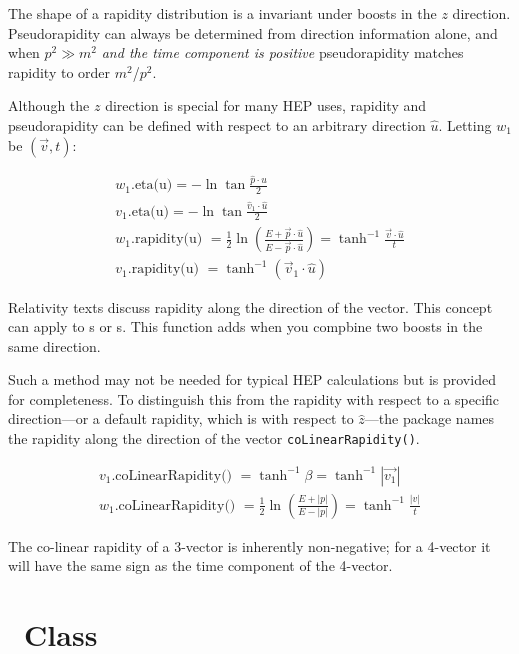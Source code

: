 \noindent
The shape of a rapidity distribution is a invariant under boosts in the $z$
direction.
Pseudorapidity can always be determined from direction information alone,
and when $ p^2 \gg m^2 $ {\em and the time component is positive}
pseudorapidity matches rapidity to order $m^2$/$p^2$.

\vspace{.2 in}

Although the $z$ direction is special for many HEP uses,
rapidity and pseudorapidity can be defined with respect to an arbitrary
direction $\hat{u}$.  Letting $w_1$ be $(\vec{v}, t)$:

\begin{eqnarray}
\label{eq:weta:4}
  w_1 \mbox{.eta(u)} = - \ln \tan \frac{\hat{p} \cdot {u}}{2} \\
\label{eq:eta:4}
  v_1 \mbox{.eta(u)} = - \ln \tan \frac{\hat{v}_1 \cdot \hat{u}} {2} \\
\label{eq:wrapid:4}
  w_1 \mbox{.rapidity(u) }
	= \frac{1}{2} \ln \left( \frac{E + \vec{p} \cdot \hat{u}}
				      {E - \vec{p} \cdot \hat{u}} \right)
	= \tanh^{-1} \frac {\vec{v} \cdot \hat{u}} {t} \\
  v_1 \mbox{.rapidity(u) } = \tanh^{-1} (\vec{v}_{1} \cdot \hat{u})
\end{eqnarray}

\noindent
Relativity texts discuss rapidity along the direction of the vector.
This concept can apply to \SV s or \LV s.
This function adds when you compbine two boosts in the same direction.

Such a method may not be needed for typical HEP calculations but
is provided for completeness.
To distinguish this from the rapidity with respect to a specific
direction---or a default rapidity, which is with respect to $\hat{z}$---the
package names the rapidity along the direction of the vector
{\tt coLinearRapidity()}.

\begin{eqnarray}
  v_1 \mbox{.coLinearRapidity() } = \tanh^{-1} \beta
	=  \tanh^{-1} \left|\vec{v_1}\right| \\
\label{eq:wcoLinRap:2}
  w_1 \mbox{.coLinearRapidity() }
	= \frac{1}{2} \ln \left( \frac{E + |p|}{E - |p|}    \right)
	= \tanh^{-1} \frac {|v|}{t}
\end{eqnarray}

\noindent
The co-linear rapidity of a 3-vector is inherently non-negative; for a
4-vector it will have the same sign as the time component of the 4-vector.

\section{\protect\Ro\ Class}

